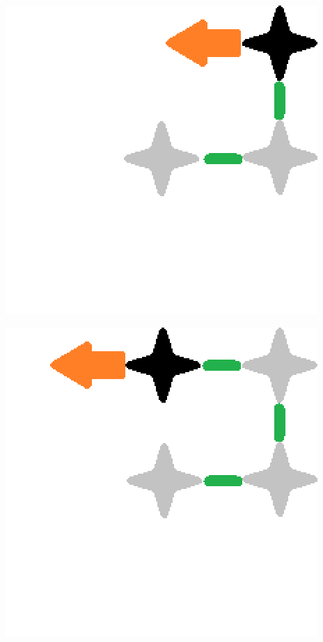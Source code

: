 \documentclass{beamer}
\begin{document}
\begin{frame}
\begin{center}
\includegraphics[scale=0.5]{images/s3.PNG}
\end{center}
\end{frame}

\begin{frame}
\begin{center}
\includegraphics[scale=0.5]{images/s4.PNG}
\end{center}
\end{frame}
\end{document}
